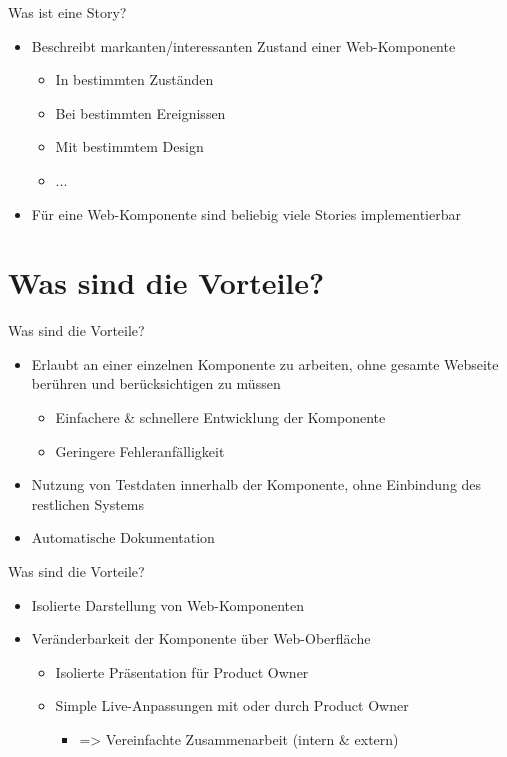 \documentclass{beamer}
\begin{document}
\begin{frame}{Was ist eine Story?}
	\begin{itemize}
		\item Beschreibt markanten/interessanten Zustand einer Web-Komponente
			\begin{itemize}
				\item In bestimmten Zuständen
				\item Bei bestimmten Ereignissen
				\item Mit bestimmtem Design
				\item ...
			\end{itemize}
		\item Für eine Web-Komponente sind beliebig viele Stories implementierbar
	\end{itemize}
\end{frame}


\section{Was sind die Vorteile?} %

\begin{frame}{Was sind die Vorteile?}
	\begin{itemize}
		\item Erlaubt an einer einzelnen Komponente zu arbeiten, ohne gesamte Webseite berühren und berücksichtigen zu müssen
		\begin{itemize}
			\item Einfachere \& schnellere Entwicklung der Komponente
			\item Geringere Fehleranfälligkeit
		\end{itemize}
		\item Nutzung von Testdaten innerhalb der Komponente, ohne Einbindung des restlichen Systems
		\item Automatische Dokumentation
	\end{itemize}
\end{frame}

\begin{frame}{Was sind die Vorteile?}
	\begin{itemize}
		\item Isolierte Darstellung von Web-Komponenten
		\item Veränderbarkeit der Komponente über Web-Oberfläche
		\begin{itemize}
			\item Isolierte Präsentation für Product Owner
			\item Simple Live-Anpassungen mit oder durch Product Owner
			\begin{itemize}
				\item => Vereinfachte Zusammenarbeit (intern \& extern)
			\end{itemize}
		\end{itemize}
	\end{itemize}
\end{frame}
\end{document}
